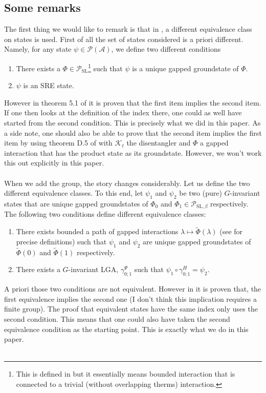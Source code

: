 \documentclass[12pt,a4paper,twoside]{article}
\newcommand{\PP}{\mathcal P}
\renewcommand{\AA}{\mathcal A}
\theoremstyle{definition}
\numberwithin{equation}{section}
\begin{document}
\subsection{Some remarks}
The first thing we would like to remark is that in \cite{ogata2021h3gmathbb}, a different equivalence class on states is used. First of all the set of states considered is a priori different. Namely, for any state $\psi\in \PP(\AA)$, we define two different conditions
\begin{enumerate}
	\item There exists a $\Phi\in\PP_{\text{SL}}$\footnote{This is defined in \cite{ogata2021h3gmathbb} but it essentially means bounded interaction that is connected to a trivial (without overlapping therms) interaction.} such that $\psi$ is a unique gapped groundstate of $\Phi$.
	\item $\psi$ is an SRE state.
\end{enumerate}
However in theorem 5.1 of \cite{ogata2021h3gmathbb} it is proven that the first item implies the second item. If one then looks at the definition of the index there, one could as well have started from the second condition. This is precisely what we did in this paper. As a side note, one should also be able to prove that the second item implies the first item by using theorem D.5 of \cite{ogata2021h3gmathbb} with $\mathcal{K}_t$ the disentangler and $\Phi$ a gapped interaction that has the product state as its groundstate. However, we won't work this out explicitly in this paper.\\\\
When we add the group, the story changes considerably. Let us define the two different equivalence classes. To this end, let $\psi_1$ and $\psi_2$ be two (pure) $G$-invariant states that are unique gapped groundstates of $\Phi_0$ and $\Phi_1\in\PP_{\text{SL},\beta}$ respectively. The following two conditions define different equivalence classes:
\begin{enumerate}
	\item There exists bounded a path of gapped interactions $\lambda\mapsto\tilde\Phi(\lambda)$ (see \cite{ogata2021h3gmathbb} for precise definitions) such that $\psi_1$ and $\psi_2$ are unique gapped groundstates of $\tilde{\Phi}(0)$ and $\tilde{\Phi}(1)$ respectively.
	\item There exists a $G$-invariant LGA, $\gamma^\Psi_{0;1}$ such that $\psi_1\circ\gamma^H_{0;1}=\psi_2$.
\end{enumerate}
A priori those two conditions are not equivalent. However in \cite{ogata2021h3gmathbb} it is proven that, the first equivalence implies the second one (I don't think this implication requires a finite group). The proof that equivalent states have the same index only uses the second condition. This means that one could also have taken the second equivalence condition as the starting point. This is exactly what we do in this paper.\\\\
\end{document}
